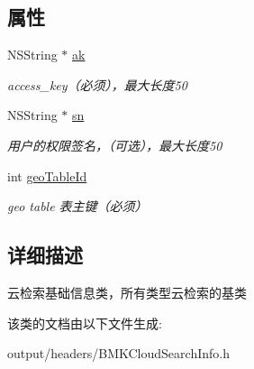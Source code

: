 \subsection*{属性}
\begin{DoxyCompactItemize}
\item 
\hypertarget{interface_b_m_k_base_cloud_search_info_a3ac025d61069505d4ff685e4c77b78a4}{}N\+S\+String $\ast$ \hyperlink{interface_b_m_k_base_cloud_search_info_a3ac025d61069505d4ff685e4c77b78a4}{ak}\label{interface_b_m_k_base_cloud_search_info_a3ac025d61069505d4ff685e4c77b78a4}

\begin{DoxyCompactList}\small\item\em access\+\_\+key（必须），最大长度50 \end{DoxyCompactList}\item 
\hypertarget{interface_b_m_k_base_cloud_search_info_a0dcbea8108d264a217566025d43aff12}{}N\+S\+String $\ast$ \hyperlink{interface_b_m_k_base_cloud_search_info_a0dcbea8108d264a217566025d43aff12}{sn}\label{interface_b_m_k_base_cloud_search_info_a0dcbea8108d264a217566025d43aff12}

\begin{DoxyCompactList}\small\item\em 用户的权限签名，（可选），最大长度50 \end{DoxyCompactList}\item 
\hypertarget{interface_b_m_k_base_cloud_search_info_acb6f48270abf3f46a0412bcd658d099c}{}int \hyperlink{interface_b_m_k_base_cloud_search_info_acb6f48270abf3f46a0412bcd658d099c}{geo\+Table\+Id}\label{interface_b_m_k_base_cloud_search_info_acb6f48270abf3f46a0412bcd658d099c}

\begin{DoxyCompactList}\small\item\em geo table 表主键（必须） \end{DoxyCompactList}\end{DoxyCompactItemize}


\subsection{详细描述}
云检索基础信息类，所有类型云检索的基类 

该类的文档由以下文件生成\+:\begin{DoxyCompactItemize}
\item 
output/headers/B\+M\+K\+Cloud\+Search\+Info.\+h\end{DoxyCompactItemize}
